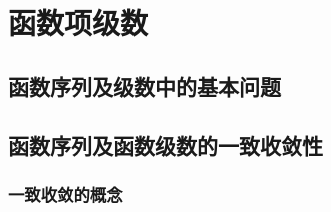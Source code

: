 

\chapter{函数项级数}\label{ch:12}

\section{函数序列及级数中的基本问题}

\section{函数序列及函数级数的一致收敛性}
\subsection{一致收敛的概念}
